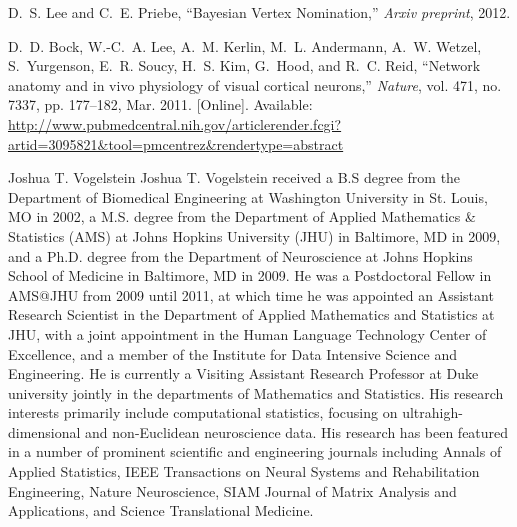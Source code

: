 \documentclass[10pt,journal,cspaper,compsoc]{IEEEtran}
\begin{document}
\begin{thebibliography}{10}
D.~S. Lee and C.~E. Priebe, ``{Bayesian Vertex Nomination},'' \emph{Arxiv
  preprint}, 2012.

\BIBentryALTinterwordspacing
D.~D. Bock, W.-C.~A. Lee, A.~M. Kerlin, M.~L. Andermann, A.~W. Wetzel,
  S.~Yurgenson, E.~R. Soucy, H.~S. Kim, G.~Hood, and R.~C. Reid, ``{Network
  anatomy and in vivo physiology of visual cortical neurons},'' \emph{Nature},
  vol. 471, no. 7337, pp. 177--182, Mar. 2011. [Online]. Available:
  \url{http://www.pubmedcentral.nih.gov/articlerender.fcgi?artid=3095821\&tool=pmcentrez\&rendertype=abstract}
\BIBentrySTDinterwordspacing

\end{thebibliography}


\begin{IEEEbiography}
{Joshua T. Vogelstein}
Joshua T. Vogelstein received a B.S degree from the Department of Biomedical Engineering at Washington University in St. Louis, MO in 2002, a M.S. degree from the Department of Applied Mathematics \& Statistics (AMS) at Johns Hopkins University (JHU) in Baltimore, MD in 2009, and a Ph.D. degree from the Department of Neuroscience at Johns Hopkins School of Medicine in Baltimore, MD in 2009.  He was a Postdoctoral Fellow in AMS@JHU from 2009 until 2011, at which time he was appointed
 an Assistant Research Scientist in the Department of Applied Mathematics and Statistics at JHU, with a joint appointment in the Human Language Technology Center of Excellence, and a member of the Institute for Data Intensive Science and Engineering.  He is currently a Visiting Assistant Research Professor at Duke university jointly in the departments of Mathematics and Statistics.  His research interests primarily include computational statistics, focusing on ultrahigh-dimensional and non-Euclidean neuroscience data.  His research has been featured in a number of prominent scientific and engineering journals including Annals of Applied Statistics, IEEE Transactions on Neural Systems and Rehabilitation Engineering, Nature Neuroscience, SIAM Journal of Matrix Analysis and Applications, and Science Translational Medicine.
\end{IEEEbiography}
\end{document}
